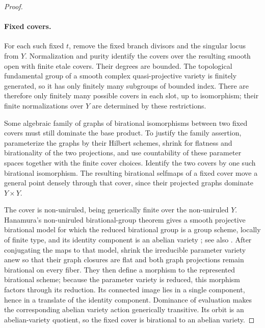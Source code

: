 \begin{proof}
\paragraph{Fixed covers.}
For each such fixed \(t\), remove the fixed branch divisors and
the singular locus from \(Y\).  Normalization and purity identify
the covers over the resulting smooth open with finite etale
covers.  Their degrees are bounded.  The topological fundamental
group of a smooth complex quasi-projective variety is finitely
generated, so it has only finitely many subgroups of bounded
index.  There are therefore only finitely many possible covers
in each slot, up to isomorphism; their finite normalizations over
\(Y\) are determined by these restrictions.

Some algebraic family of graphs of birational isomorphisms between
two fixed covers must still dominate the base product.  To justify
the family assertion, parameterize the graphs by their Hilbert
schemes, shrink for flatness and birationality of the two
projections, and use countability of these parameter spaces
together with the finite cover choices.  Identify the two covers
by one such birational isomorphism.  The resulting birational
selfmaps of a fixed cover move a general point densely through
that cover, since their projected graphs dominate \(Y\times Y\).

The cover is non-uniruled, being generically finite over the
non-uniruled \(Y\).  Hanamura's non-uniruled birational-group
theorem gives a smooth projective birational model for which the
reduced birational group is a group scheme, locally of finite type,
and its identity component is an abelian variety
\cite[Theorems~2.1--2.2]{Proj-Hanamura1988};
see also \cite[Proposition~3.7 and Theorems~3.8--3.9]{Proj-Blanc2017}.
After conjugating the maps to that model, shrink the irreducible
parameter variety anew so that their graph closures are flat
and both graph projections remain birational on every fiber.
They then define a morphism to the represented birational scheme;
because the parameter variety is reduced, this morphism factors
through its reduction.  Its connected image lies in a single
component, hence in a translate of the identity component.
Dominance of evaluation makes the corresponding
abelian variety action generically transitive.  Its orbit is an
abelian-variety quotient, so the fixed cover is birational to an
abelian variety.


\end{proof}
